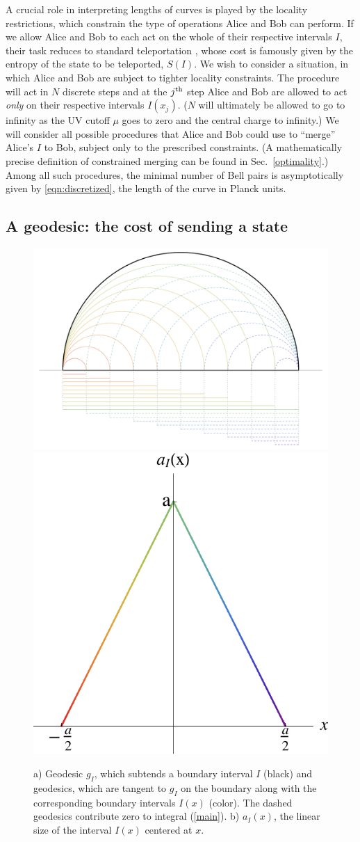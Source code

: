 \documentclass[12pt]{article}
\newcommand{\secref}[1]{Sec.~\ref{#1}}
\begin{document}
A crucial role in interpreting lengths of curves is played by the locality restrictions, which constrain the type of operations Alice and Bob can perform. If we allow Alice and Bob to each act on the whole of their respective intervals $I$, their task reduces to standard teleportation \cite{teleport}, whose cost is famously given by the entropy of the state to be teleported, $S(I)$. We wish to consider a situation, in which Alice and Bob are subject to tighter locality constraints. The procedure will act in $N$ discrete steps and at the $j^{\rm th}$ step Alice and Bob are allowed to act \emph{only} on their respective intervals $I(x_j)$. ($N$ will ultimately be allowed to go to infinity as the UV cutoff $\mu$ goes to zero and the central charge to infinity.)
We will consider all possible procedures that Alice and Bob could use to ``merge'' Alice's $I$ to Bob, subject only to the prescribed constraints. (A mathematically precise definition of constrained merging can be found in \secref{optimality}.) Among all such procedures, the minimal number of Bell pairs  is asymptotically given by \eqref{eqn:discretized}, the length of the curve in Planck units.

\subsection{A geodesic: the cost of sending a state}
\label{explgeodesic}

\begin{figure}[t!]
\centering
{}\includegraphics[width=.5\textwidth]{picgeodesic.pdf}
\includegraphics[width=.35\textwidth]{aforgeodesic.pdf}
\caption{a) Geodesic $g_I$, which subtends a boundary interval $I$ (black) and geodesics, which are tangent to $g_I$ on the boundary along with the corresponding boundary intervals $I(x)$ (color). The dashed geodesics contribute zero to integral (\ref{main}). b) $a_I(x)$, the linear size of the interval $I(x)$ centered at $x$.}
\label{picgeodesic}
\end{figure}
\end{document}
